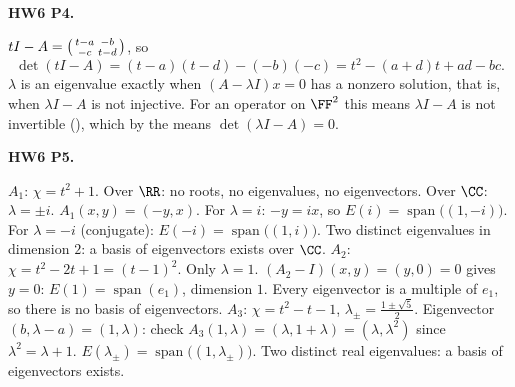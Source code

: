 \documentclass[10pt]{scrartcl}
\DeclareMathOperator{\spn}{span}\DeclareMathOperator{\nul}{null}\DeclareMathOperator{\range}{range}
\begin{document}
\begin{prob}\textbf{HW6 P4.}\par{}
\begin{steps}
  \ii $tI-A=\begin{psmallmatrix}t-a&-b\\-c&t-d\end{psmallmatrix}$, so
  \[
    \det(tI-A)=(t-a)(t-d)-(-b)(-c)=t^2-(a+d)t+ad-bc.
  \]
  \ii $\lambda$ is an eigenvalue exactly when $(A-\lambda I)x=0$ has a nonzero solution, that is, when $\lambda I-A$ is not injective. For an operator on $\FF^2$ this means $\lambda I-A$ is not invertible (), which by the  means $\det(\lambda I-A)=0$.
\end{steps}
\end{prob}

\begin{prob}\textbf{HW6 P5.}\par{}
\begin{steps}
  \ii $A_1$: $\chi=t^2+1$. Over $\RR$: no roots, no eigenvalues, no eigenvectors. Over $\CC$: $\lambda=\pm i$. $A_1(x,y)=(-y,x)$. For $\lambda=i$: $-y=ix$, so $E(i)=\spn\bigl((1,-i)\bigr)$. For $\lambda=-i$ (conjugate): $E(-i)=\spn\bigl((1,i)\bigr)$. Two distinct eigenvalues in dimension $2$: a basis of eigenvectors exists over $\CC$.
  \ii $A_2$: $\chi=t^2-2t+1=(t-1)^2$. Only $\lambda=1$. $(A_2-I)(x,y)=(y,0)=0$ gives $y=0$: $E(1)=\spn(e_1)$, dimension $1$. Every eigenvector is a multiple of $e_1$, so there is no basis of eigenvectors.
  \ii $A_3$: $\chi=t^2-t-1$, $\lambda_\pm=\frac{1\pm\sqrt5}2$. Eigenvector $(b,\lambda-a)=(1,\lambda)$: check $A_3(1,\lambda)=(\lambda,1+\lambda)=(\lambda,\lambda^2)$ since $\lambda^2=\lambda+1$. $E(\lambda_\pm)=\spn\bigl((1,\lambda_\pm)\bigr)$. Two distinct real eigenvalues: a basis of eigenvectors exists.
\end{steps}
\end{prob}
\end{document}
